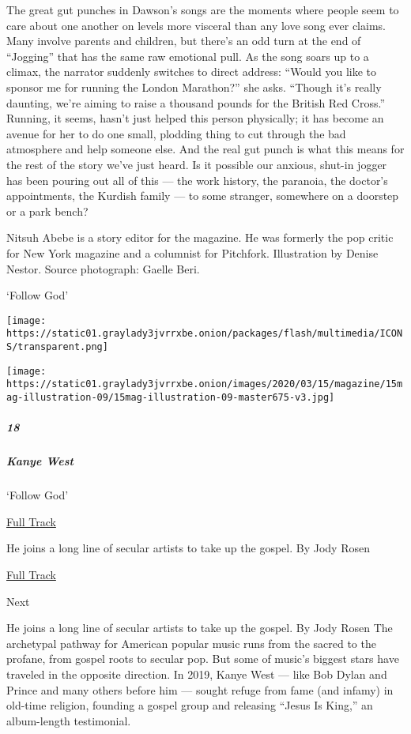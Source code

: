 The great gut punches in Dawson's songs are the moments where people
seem to care about one another on levels more visceral than any love
song ever claims. Many involve parents and children, but there's an odd
turn at the end of ``Jogging'' that has the same raw emotional pull. As
the song soars up to a climax, the narrator suddenly switches to direct
address: ``Would you like to sponsor me for running the London
Marathon?'' she asks. ``Though it's really daunting, we're aiming to
raise a thousand pounds for the British Red Cross.'' Running, it seems,
hasn't just helped this person physically; it has become an avenue for
her to do one small, plodding thing to cut through the bad atmosphere
and help someone else. And the real gut punch is what this means for the
rest of the story we've just heard. Is it possible our anxious, shut-in
jogger has been pouring out all of this --- the work history, the
paranoia, the doctor's appointments, the Kurdish family --- to some
stranger, somewhere on a doorstep or a park bench?

Nitsuh Abebe is a story editor for the magazine. He was formerly the pop
critic for New York magazine and a columnist for Pitchfork. Illustration
by Denise Nestor. Source photograph: Gaelle Beri.

`Follow God'

\texttt{[image: https://static01.graylady3jvrrxbe.onion/packages/flash/multimedia/ICONS/transparent.png]}

\texttt{[image: https://static01.graylady3jvrrxbe.onion/images/2020/03/15/magazine/15mag-illustration-09/15mag-illustration-09-master675-v3.jpg]}

\hypertarget{18}{%
\subparagraph{18}\label{18}}

\hypertarget{kanye-west}{%
\subparagraph{Kanye West}\label{kanye-west}}

`Follow God'

\href{https://open.spotify.com/track/2QpGZOhTCHHiKmpSO9FW4h?si=ETIXCm3WQC-MpAZ2BiTyIw}{
Full Track}

He joins a long line of secular artists to take up the gospel. By Jody
Rosen

\href{https://open.spotify.com/track/2QpGZOhTCHHiKmpSO9FW4h?si=ETIXCm3WQC-MpAZ2BiTyIw}{Full
Track }

Next

He joins a long line of secular artists to take up the gospel. By Jody
Rosen The archetypal pathway for American popular music runs from the
sacred to the profane, from gospel roots to secular pop. But some of
music's biggest stars have traveled in the opposite direction. In 2019,
Kanye West --- like Bob Dylan and Prince and many others before him ---
sought refuge from fame (and infamy) in old-time religion, founding a
gospel group and releasing ``Jesus Is King,'' an album-length
testimonial.

